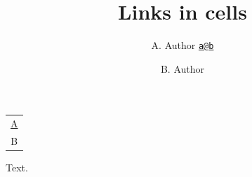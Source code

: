 \documentclass{article}
\title{Links in cells}
\author{A. Author \href{mailto:a@b}{\texttt{a@b}}\and B. Author}
\date{}
\begin{document}
\maketitle
\begin{tabular}{c}\href{mailto:a@b}{A}\\B\end{tabular}\par Text.
\end{document}
